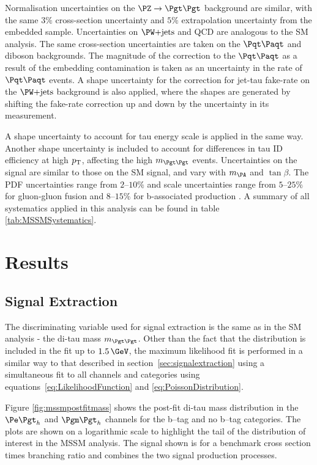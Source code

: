 Normalisation uncertainties on the $\ZToTauTau$ background are similar, with the
same $3\%$ cross-section uncertainty and $5\%$ extrapolation uncertainty from
the embedded sample. Uncertainties on $\WJets$ and QCD are analogous to the
\ac{SM} analysis. The same cross-section uncertainties are taken on the $\ttbar$
and diboson backgrounds. The magnitude of the correction to the $\ttbar$ as a result 
of the embedding contamination is taken as an uncertainty in the rate of $\ttbar$ events. A shape 
uncertainty for the correction for jet-tau fake-rate on the $\WJets$ background
is also applied, where the shapes are generated by shifting the fake-rate
correction up and down by the uncertainty in its measurement. 

A shape uncertainty to account for tau energy scale is applied in the same way. 
Another shape uncertainty is included to account for differences in tau ID
efficiency at high $p_{\mathrm{T}}$, affecting the high $m_{\Pgt\Pgt}$ events. 
Uncertainties on the signal are similar to those on the \ac{SM} signal, and vary
with $m_{\PA}$ and $\tan\beta$. The \ac{PDF} uncertainties range from $2$--$10\%$ and scale uncertainties range from
$5$--$25\%$ for gluon-gluon fusion and $8$--$15\%$ for b-associated production
\cite{HIG-13-021}. A summary of all systematics applied in this analysis can be
found in table \ref{tab:MSSMSystematics}.



\section{Results}
\label{sec:mssmresults}

\subsection{Signal Extraction}
\label{sec:mssmSignalExtraction}

The discriminating variable used for signal extraction is the same as in the
\ac{SM} analysis - the di-tau mass $m_{\Pgt\Pgt}$. Other than the fact that the distribution is
included in the fit up to $1.5\,\GeV$, the maximum likelihood fit is performed in
a similar way to that described in section~\ref{sec:signalextraction} using a simultaneous 
fit to all channels and
categories using equations~\ref{eq:LikelihoodFunction} and \ref{eq:PoissonDistribution}.

Figure \ref{fig:mssmpostfitmass} shows the post-fit di-tau mass distribution in the
$\etau$ and $\mutau$ channels for the b--tag and no b--tag categories. The plots
are shown on a logarithmic scale to highlight the tail of the distribution of
interest in the \ac{MSSM} analysis. The signal shown is for a benchmark cross
section times branching ratio and combines the two signal production processes.

